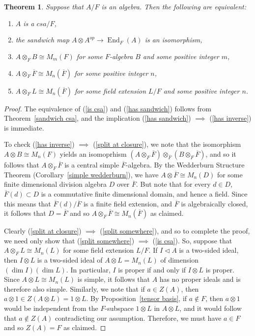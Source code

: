 \documentclass[12pt]{report}
\theoremstyle{plain}
\newtheorem{thm}{Theorem}[section]
\newcommand{\oper}[1]{\operatorname{#1}}
\newcommand{\ov}{\overline}
\newcommand{\End}{\oper{End}}
\begin{document}
\begin{thm}
Suppose that $A/F$ is an algebra. Then the following are equivalent:
\begin{enumerate}[1. ]
\item \label{is csa} $A$ is a $csa/F$,
\item \label{has sandwich} the sandwich map $A \otimes A^{op} \to
\End_F(A)$ is an isomorphism,
\item \label{has inverse} $A \otimes_F B \cong M_m(F)$ for some $F$-algebra
$B$ and some positive integer $m$,
\item \label{split at closure} $A \otimes_F \ov{F} \cong M_n(\ov F)$ for
some positive integer $n$,
\item \label{split somewhere} $A \otimes_F L \cong M_n(\ov F)$ for some
field extension $L/F$ and some positive integer $n$.
\end{enumerate}
\end{thm}
\begin{proof}
The equivalence of (\ref{is csa}) and (\ref{has sandwich}) follows from
Theorem~\ref{sandwich csa}, and the implication (\ref{has sandwich})
$\implies$ (\ref{has inverse}) is immediate.

To check (\ref{has inverse}) $\implies$ (\ref{split at closure}), we note
that the isomorphism $A \otimes B \cong M_n(F)$ yields an isomoprhism
$(A \otimes_F {\ov F}) \otimes_{\ov F} (B \otimes_F {\ov F})$, and so it
follows that $A \otimes_F \ov F$ is a central simple $\ov F$-algebra. By
the Wedderburn Structure Theorem (Corollary~\ref{simple wedderburn}), we
have $A \otimes \ov F \cong M_n(D)$ for some finite dimensional division
algebra $D$ over $\ov F$. But note that for every $d \in D$, $\ov F(d) \subset
D$ is a commutative finite dimensional domain, and hence a field. Since
this means that $\ov F(d)/\ov F$ is a finite field extension, and $\ov F$
is algebraically closed, it follows that $D = \ov F$ and so $A \otimes_F
\ov F \cong M_n(\ov F)$ as claimed.

Clearly (\ref{split at closure}) $\implies$ (\ref{split somewhere}), and so
to complete the proof, we need only show that (\ref{split somewhere})
$\implies$ (\ref{is csa}). So, suppose that $A \otimes_F L \cong M_n(L)$
for some field extension $L/F$. If $I \triangleleft A$ is a two-sided
ideal, then $I \otimes L$ is a two-sided ideal of $A \otimes L  = M_n(L)$ of
dimension $(\dim I)(\dim L)$. In particular, $I$ is proper if and only if
$I \otimes L$ is proper. Since $A \otimes L \cong M_n(L)$ is simple, it
follows that $A$ has no proper ideals and is therefore also simple.
Similarly, we note that if $a \in Z(A)$, then $a \otimes 1 \in Z(A \otimes
L) = 1 \otimes L$. By Proposition~\ref{tensor basis}, if $a \not\in F$,
then $a \otimes 1$ would be independent from the $F$-subspace $1 \otimes L$
in $A \otimes L$, and it would follow that $a \not\in Z(A)$ contradicting
our assumption. Therefore, we must have $a \in F$ and so $Z(A) = F$ as
claimed.

\end{proof}
\end{document}
